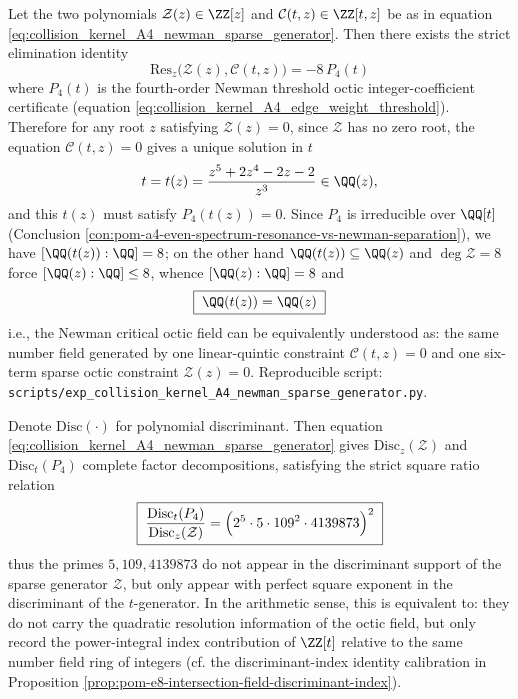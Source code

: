 \begin{conclusion}\label{con:pom-a4-newman-sparse-generator-elimination}
Let the two polynomials \(\mathcal Z(z)\in\ZZ[z]\) and \(\mathcal C(t,z)\in\ZZ[t,z]\) be as in equation \eqref{eq:collision_kernel_A4_newman_sparse_generator}.
Then there exists the strict elimination identity
\[
\boxed{\;
\mathrm{Res}_z\!\bigl(\mathcal Z(z),\mathcal C(t,z)\bigr)=-8\,P_4(t)\;}
\]
where \(P_4(t)\) is the fourth-order Newman threshold octic integer-coefficient certificate (equation \eqref{eq:collision_kernel_A4_edge_weight_threshold}).
Therefore for any root \(z\) satisfying \(\mathcal Z(z)=0\), since \(\mathcal Z\) has no zero root, the equation \(\mathcal C(t,z)=0\) gives a unique solution in \(t\)
\[
t=t(z)=\frac{z^5+2z^4-2z-2}{z^3}\in\QQ(z),
\]
and this \(t(z)\) must satisfy \(P_4(t(z))=0\).
Since \(P_4\) is irreducible over \(\QQ[t]\) (Conclusion \ref{con:pom-a4-even-spectrum-resonance-vs-newman-separation}), we have \([\QQ(t(z)):\QQ]=8\);
on the other hand \(\QQ(t(z))\subseteq \QQ(z)\) and \(\deg\mathcal Z=8\) force \([\QQ(z):\QQ]\le 8\), whence \([\QQ(z):\QQ]=8\) and
\[
\boxed{\;\QQ(t(z))=\QQ(z)\;}
\]
i.e., the Newman critical octic field can be equivalently understood as: the same number field generated by one linear-quintic constraint \(\mathcal C(t,z)=0\) and one six-term sparse octic constraint \(\mathcal Z(z)=0\).
Reproducible script: \texttt{scripts/exp\_collision\_kernel\_A4\_newman\_sparse\_generator.py}.
\end{conclusion}



\begin{conclusion}\label{con:pom-a4-newman-discriminant-index-artifact}
Denote \(\mathrm{Disc}(\cdot)\) for polynomial discriminant.
Then equation \eqref{eq:collision_kernel_A4_newman_sparse_generator} gives \(\mathrm{Disc}_z(\mathcal Z)\) and \(\mathrm{Disc}_t(P_4)\) complete factor decompositions, satisfying the strict square ratio relation
\[
\boxed{\;
\frac{\mathrm{Disc}_t(P_4)}{\mathrm{Disc}_z(\mathcal Z)}
=\Bigl(2^{5}\cdot 5\cdot 109^{2}\cdot 4139873\Bigr)^2\;}
\]
thus the primes \(5,109,4139873\) do not appear in the discriminant support of the sparse generator \(\mathcal Z\), but only appear with perfect square exponent in the discriminant of the \(t\)-generator.
In the arithmetic sense, this is equivalent to: they do not carry the quadratic resolution information of the octic field, but only record the power-integral index contribution of \(\ZZ[t]\) relative to the same number field ring of integers (cf. the discriminant-index identity calibration in Proposition \ref{prop:pom-e8-intersection-field-discriminant-index}).
\end{conclusion}

